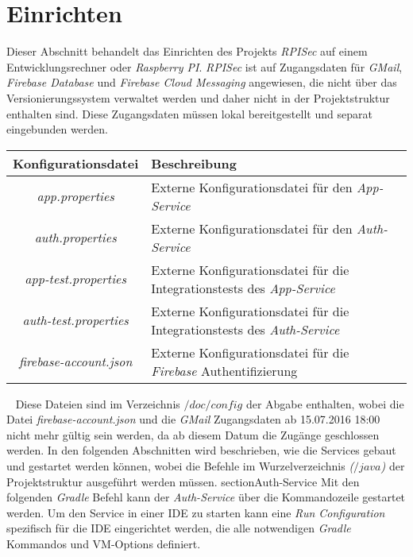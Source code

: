 \documentclass[]{article}
\begin{document}
\section{Einrichten}
Dieser Abschnitt behandelt das Einrichten des Projekts \emph{RPISec} auf einem Entwicklungsrechner oder \emph{Raspberry PI}. \emph{RPISec} ist auf Zugangsdaten für \emph{GMail}, \emph{Firebase Database} und \emph{Firebase Cloud Messaging} angewiesen, die nicht über das Versionierungssystem verwaltet werden und daher nicht in der Projektstruktur enthalten sind. Diese Zugangsdaten müssen lokal bereitgestellt und separat eingebunden werden.
{\renewcommand{\arraystretch}{2}%
\begin{center}
	\begin{tabular}{| c | l | p{7cm} |}
		\hline
		\textbf{Konfigurationsdatei} & \textbf{Beschreibung}  \\ \hline
		\textit{app.properties} & Externe Konfigurationsdatei für den \emph{App-Service} \\ \hline
		\textit{auth.properties} & Externe Konfigurationsdatei für den \emph{Auth-Service} \\ \hline
		\textit{app-test.properties} & Externe Konfigurationsdatei für die Integrationstests des \emph{App-Service} \\ \hline
		\textit{auth-test.properties} & Externe Konfigurationsdatei für die Integrationstests des \emph{Auth-Service} \\ \hline
		\textit{firebase-account.json} & Externe Konfigurationsdatei für die \emph{Firebase} Authentifizierung \\ \hline
	\end{tabular}
\end{center}
\ \newline
Diese Dateien sind im Verzeichnis \emph{$/doc/config$} der Abgabe enthalten, wobei die Datei \emph{firebase-account.json} und die \emph{GMail} Zugangsdaten ab 15.07.2016 18:00 nicht mehr gültig sein werden, da ab diesem Datum die Zugänge geschlossen werden.
\newline
\newline
In den folgenden Abschnitten wird beschrieben, wie die Services gebaut und gestartet werden können, wobei die Befehle im Wurzelverzeichnis \emph{($/java$)} der Projektstruktur ausgeführt werden müssen.
\newpage
section{Auth-Service}
Mit den folgenden \emph{Gradle} Befehl kann der \emph{Auth-Service} über die Kommandozeile gestartet werden. Um den Service in einer IDE zu starten kann eine \emph{Run Configuration} spezifisch für die IDE eingerichtet werden, die alle notwendigen \emph{Gradle} Kommandos und VM-Options definiert.
}
\end{document}
